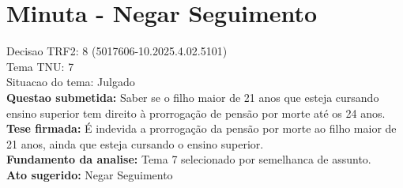 \documentclass{article}
\begin{document}
\section*{Minuta - Negar Seguimento}
Decisao TRF2: 8 (5017606-10.2025.4.02.5101)\\
Tema TNU: 7\\
Situacao do tema: Julgado\\
\textbf{Questao submetida:} Saber se o filho maior de 21 anos que esteja cursando ensino superior tem direito à prorrogação de pensão por morte até os 24 anos.\\
\textbf{Tese firmada:} É indevida a prorrogação da pensão por morte ao filho maior de 21 anos, ainda que esteja cursando o ensino superior.\\
\textbf{Fundamento da analise:} Tema 7 selecionado por semelhanca de assunto.\\
\textbf{Ato sugerido:} Negar Seguimento
\end{document}

